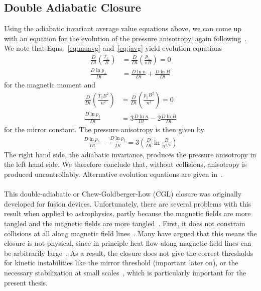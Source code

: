 \subsection{Double Adiabatic Closure}\label{ssec:cglclosure}
Using the adiabatic invariant average value equations above, we can come up with an equation for the evolution of the pressure anisotropy, again following~\citet{KunzBraginskii}. We note that Eqns.~\ref{eq:muavg} and~\ref{eq:javg} yield evolution equations
\begin{align}
  \frac D{Dt}\left(\frac{T_\perp}B\right)&=\frac D{Dt}\left(\frac{p_\perp}{nB}\right)=0\nonumber\\
  \frac{D\ln p_\perp}{Dt}&=\frac{D\ln n}{Dt}+\frac{D\ln B}{Dt}\label{eq:perpev}
\end{align}
for the magnetic moment and
\begin{align}  
  \frac D{Dt}\left(\frac{T_\parallel B^2}{n^2}\right)&=\frac D{Dt}\left(\frac{p_\parallel B^2}{n^3}\right)=0\nonumber\\
  \frac{D\ln p_\parallel}{Dt}&=3\frac{D\ln n}{Dt}-2\frac{D\ln B}{Dt}\label{eq:parev}
\end{align}
for the mirror constant. The pressure anisotropy is then given by
\begin{align*}
  \frac{D\ln p_\perp}{Dt}-\frac{D\ln p_\parallel}{Dt}=3\left(\frac{D}{Dt}\ln\frac{B}{n^{2/3}}\right)
\end{align*}
The right hand side, the adiabatic invariance, produces the pressure anisotropy in the left hand side. We therefore conclude that, without collisions, anisotropy is produced uncontrollably. Alternative evolution equations are given in~\citet{Strumik2016}. \\
\\
This double-adiabatic or Chew-Goldberger-Low (CGL) closure was originally developed for fusion devices. Unfortunately, there are several problems with this result when applied to astrophysics, partly because the magnetic fields are more tangled and the magnetic fields are more tangled~\cite{Sharma2006}. First, it does not constrain collisions at all along magnetic field lines~\cite{CGL1956}. Many have argued that this means the closure is not physical, since in principle heat flow along magnetic field lines can be arbitrarily large~\cite{Mahajan2002,Hazeltine2004,Tenbarge2008}. As a result, the closure does not give the correct thresholds for kinetic instabilities like the mirror threshold (important later on), or the necessary stabilization at small scales~\cite{Passot2013}, which is particularly important for the present thesis.

